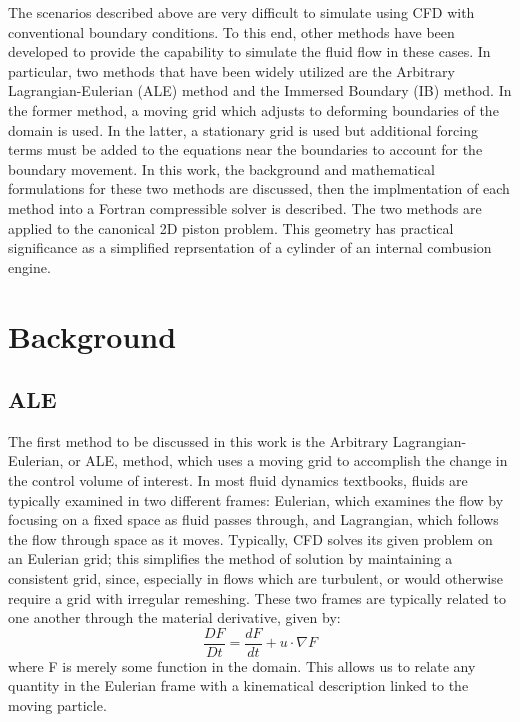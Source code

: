 \documentclass{article}
\def\deriv#1#2{\frac{d #1}{d #2}}
\begin{document}
The scenarios described above are very difficult to simulate using CFD with conventional boundary conditions.  To this end, other methods have been developed to provide the capability to simulate the fluid flow in these cases. In particular, two methods that have been widely utilized are the Arbitrary Lagrangian-Eulerian (ALE) method and the Immersed Boundary (IB) method. In the former method, a moving grid which adjusts to deforming boundaries of the domain is used. In the latter, a stationary grid is used but additional forcing terms must be added to the equations near the boundaries to account for the boundary movement. In this work, the background and mathematical formulations for these two methods are discussed, then the implmentation of each method into a Fortran compressible solver is described. The two methods are applied to the canonical 2D piston problem. This geometry has practical significance as a simplified reprsentation of a cylinder of an internal combusion engine.  \color{red}{[Include references to seminal papers and/or major review paper for each method]} \color{black}


 

\section{Background}

\subsection{ALE}

The first method to be discussed in this work is the Arbitrary Lagrangian-Eulerian, or ALE, method, which uses a moving grid to accomplish the change in the control volume of interest.  In most fluid dynamics textbooks, fluids are typically examined in two different frames: Eulerian, which examines the flow by focusing on a fixed space as fluid passes through, and Lagrangian, which follows the flow through space as it moves.  Typically, CFD solves its given problem on an Eulerian grid; this simplifies the method of solution by maintaining a consistent grid, since, especially in flows which are turbulent, or would otherwise require a grid with irregular remeshing.  These two frames are typically related to one another through the material derivative, given by:
\begin{equation}
  \frac{DF}{Dt} = \deriv{F}{t} + u \cdot \nabla F
\end{equation}
where F is merely some function in the domain.  This allows us to relate any quantity in the Eulerian frame with a kinematical description linked to the moving particle.  
\end{document}

